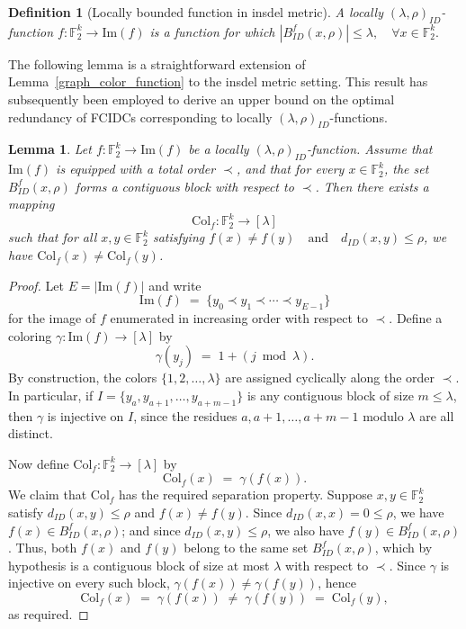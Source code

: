 \documentclass[11 pt]{article}
\numberwithin{equation}{section}
\newtheorem{lemma}[theorem]{Lemma}
\newtheorem{definition}[theorem]{Definition}
\begin{document}
    \begin{definition}[Locally bounded function in insdel metric]
        A locally $(\lambda, \rho)_{ID}$-function $f: \mathbb{F}_2^k \rightarrow \mathrm{Im}(f)$ is a function for which $|B_{ID}^f(x,\rho)| \leq \lambda, \quad \forall x \in \mathbb{F}_2^k. $
    \end{definition}

    The following lemma is a straightforward extension of Lemma~\ref{graph_color_function} to the insdel metric setting. This result has subsequently been employed to derive an upper bound on the optimal redundancy of FCIDCs corresponding to locally $(\lambda, \rho)_{ID}$-functions.

    \begin{lemma}\label{insdel_graph_coloring_function}       
        Let $f : \mathbb{F}_2^k \rightarrow \mathrm{Im}(f)$ be a locally $(\lambda, \rho)_{ID}$-function. 
        Assume that $\mathrm{Im}(f)$ is equipped with a total order $\prec$, and that for every $x \in \mathbb{F}_2^k$, the set $B_{ID}^f(x,\rho)$
        forms a contiguous block with respect to $\prec$.
        Then there exists a mapping
        \[
            \mathrm{Col}_f : \mathbb{F}_2^k \rightarrow [\lambda]
        \]
        such that for all $x,y \in \mathbb{F}_2^k$ satisfying $f(x) \neq f(y) \quad \text{and} \quad d_{ID}(x,y) \leq \rho$, we have $\mathrm{Col}_f(x) \neq \mathrm{Col}_f(y)$.
    \end{lemma}

    \begin{proof}
    Let $E = |\mathrm{Im}(f)|$ and write
    \[
    \mathrm{Im}(f) \;=\; \{y_0 \prec y_1 \prec \cdots \prec y_{E-1}\}
    \]
    for the image of $f$ enumerated in increasing order with respect to $\prec$. Define a coloring $\gamma : \mathrm{Im}(f) \to [\lambda]$ by
    \[
    \gamma(y_j) \;=\; 1 + (j \bmod \lambda).
    \]
    By construction, the colors $\{1, 2, \ldots, \lambda\}$ are assigned cyclically along the order $\prec$. In particular, if $I = \{y_a, y_{a+1}, \ldots, y_{a + m - 1}\}$ is any contiguous block of size $m \leq \lambda$, then $\gamma$ is injective on $I$, since the residues $a, a+1, \ldots, a + m - 1$ modulo $\lambda$ are all distinct.

    Now define $\mathrm{Col}_f : \mathbb{F}_2^k \to [\lambda]$ by
    \[
    \mathrm{Col}_f(x) \;=\; \gamma(f(x)).
    \]
    We claim that $\mathrm{Col}_f$ has the required separation property. Suppose $x, y \in \mathbb{F}_2^k$ satisfy $d_{ID}(x, y) \leq \rho$ and $f(x) \neq f(y)$. Since $d_{ID}(x, x) = 0 \leq \rho$, we have $f(x) \in B^{f}_{ID}(x, \rho)$; and since $d_{ID}(x, y) \leq \rho$, we also have $f(y) \in B^{f}_{ID}(x, \rho)$. Thus, both $f(x)$ and $f(y)$ belong to the same set $B^{f}_{ID}(x, \rho)$, which by hypothesis is a contiguous block of size at most $\lambda$ with respect to $\prec$. Since $\gamma$ is injective on every such block, $\gamma(f(x)) \neq \gamma(f(y))$, hence
    \[
    \mathrm{Col}_f(x) \;=\; \gamma(f(x)) \;\neq\; \gamma(f(y)) \;=\; \mathrm{Col}_f(y),
    \]
    as required.
    \end{proof}
\end{document}

